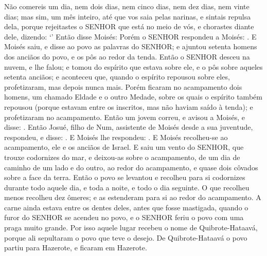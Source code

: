 {{{{  Não comereis um dia, nem dois dias, nem cinco dias, nem dez dias, nem vinte dias;
  mas sim, um mês inteiro, até que vos saia pelas narinas, e sintais repulsa dela, porque rejeitastes o SENHOR que está no meio de vós, e chorastes diante dele, dizendo: \enquote*{}}}}
  Então disse Moisés: 
  Porém o SENHOR respondeu a Moisés: .
  E Moisés saiu, e disse ao povo as palavras do SENHOR; e ajuntou setenta homens dos anciãos do povo, e os pôs ao redor da tenda.
  Então o SENHOR desceu na nuvem, e lhe falou; e tomou do espírito que estava sobre ele, e o pôs sobre aqueles setenta anciãos; e aconteceu que, quando o espírito repousou sobre eles, profetizaram, mas depois nunca mais.
  Porém ficaram no acampamento dois homens, um chamado Eldade e o outro Medade, sobre os quais o espírito também repousou (porque estavam entre os inscritos, mas não haviam saído à tenda); e profetizaram no acampamento.
  Então um jovem correu, e avisou a Moisés, e disse: .
  Então Josué, filho de Num, assistente de Moisés desde a sua juventude, respondeu, e disse: .
  E Moisés lhe respondeu: .
  E Moisés recolheu-se ao acampamento, ele e os anciãos de Israel.
  E saiu um vento do SENHOR, que trouxe codornizes do mar, e deixou-as sobre o acampamento, de um dia de caminho de um lado e do outro, ao redor do acampamento, e quase dois côvados sobre a face da terra.
  Então o povo se levantou e recolheu para si codornizes durante todo aquele dia, e toda a noite, e todo o dia seguinte. O que recolheu menos recolheu dez ômeres; e as estenderam para si ao redor do acampamento.
  A carne ainda estava entre os dentes deles, antes que fosse mastigada, quando o furor do SENHOR se acendeu no povo, e o SENHOR feriu o povo com uma praga muito grande.
  Por isso aquele lugar recebeu o nome de Quibrote-Hataavá, porque ali sepultaram o povo que teve o desejo.
  De Quibrote-Hataavá o povo partiu para Hazerote, e ficaram em Hazerote.
\par }

